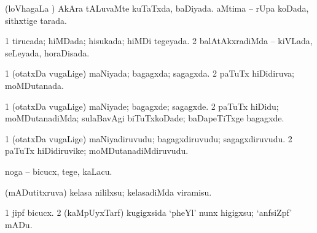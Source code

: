\bentry
{} 
\gl{\gu}
\expl{}
\bmng
(loVhagaLa \vi) 
\banum
{} AkAra tALuvaMte kuTaTxda, baDiyada. 
 aMtima -- rUpa koDada, sithxtige tarada. 
\eanum
\emng
\eentry

\bentry
{} 
\gl{\gu}
\expl{}
\bmng
\bnum
\num{1} tirucada; hiMDada; hisukada; hiMDi tegeyada. 
\num{2} balAtAkxradiMda -- kiVLada, seLeyada, horaDisada. 
\enum
\emng
\eentry

\bentry
{} 
\gl{\gu}
\expl{}
\bmng
\bnum
\num{1} (otatxDa \mo vugaLige) maNiyada; bagagxda; sagagxda. 
\num{2} paTuTx hiDidiruva; moMDutanada. 
\enum
\emng
\eentry

\bentry
{} 
\gl{\kirxvi}
\expl{}
\bmng
\bnum
\num{1} (otatxDa \mo vugaLige) maNiyade; bagagxde; sagagxde. 
\num{2} paTuTx hiDidu; moMDutanadiMda; sulaBavAgi biTuTxkoDade; baDapeTiTxge bagagxde. 
\enum
\emng
\eentry

\bentry
{} 
\gl{\nA}
\expl{}
\bmng
\bnum
\num{1} (otatxDa \mo vugaLige) maNiyadiruvudu; bagagxdiruvudu; sagagxdiruvudu. 
\num{2} paTuTx hiDidiruvike; moMDutanadiMdiruvudu. 
\enum
\emng
\eentry

\bentry
{} 
\gl{\sakirx}
\expl{}
\bmng
noga -- bicucx, tege, kaLacu. 
\emng

\noindent
\gl{\akirx}
\expl{}
\bmng
(mADutitxruva) kelasa nililxsu; kelasadiMda viramisu. 
\emng
\eentry

\bentry
{} 
\gl{\sakirx}
\bmng
\bnum
\num{1} jipf bicucx. 
\num{2} (kaMpUyxTarf) kugigxsida `pheYl' nunx higigxsu; `anfsiZpf' mADu. 
\enum
\emng
\eentry


